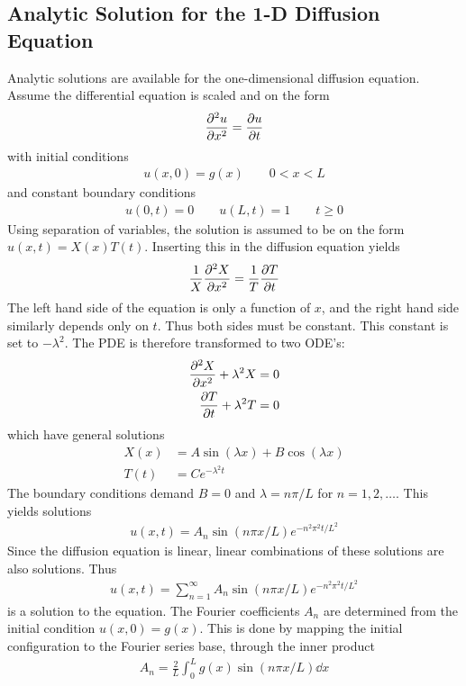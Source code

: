 \documentclass[aps,reprint]{revtex4-1}
\begin{document}
\subsection{Analytic Solution for the 1-D Diffusion Equation} \label{sec:analytic1d}
Analytic solutions are available for the one-dimensional diffusion equation. Assume
the differential equation is scaled and on the form
\begin{align*}
  \pdv[2]{u}{x} = \pdv{u}{t}
\end{align*}
with initial conditions
\begin{align*}
  u(x,0) = g(x) \qquad 0 < x < L
\end{align*}
and constant boundary conditions
\begin{align*}
  u(0,t) = 0 \qquad u(L,t) = 1 \qquad t \geq 0
\end{align*}
Using separation of variables, the solution is assumed to be on the form
$u(x,t) = X(x)T(t)$. Inserting this in the diffusion equation yields
\begin{align*}
  \frac{1}{X} \pdv[2]{X}{x} = \frac{1}{T} \pdv{T}{t}
\end{align*}
The left hand side of the equation is only a function of $x$, and the right hand
side similarly depends only on $t$. Thus both sides must be constant. This
constant is set to $-\lambda^2$.
The PDE is therefore transformed to two ODE's:
\begin{align*}
  \pdv[2]{X}{x} + \lambda^2 X &= 0 \\
  \pdv{T}{t}    + \lambda^2 T &= 0
\end{align*}
which have general solutions
\begin{align*}
  X(x) &= A\sin{(\lambda x)} + B\cos{(\lambda x)} \\
  T(t) &= Ce^{-\lambda^2 t}
\end{align*}
The boundary conditions demand $B = 0$ and $\lambda = n \pi /L$ for $n = 1,2,\hdots$.
This yields solutions
\begin{align*}
  u(x,t) = A_n \sin{(n\pi x/L)}e^{-n^2 \pi^2 t/ L^2}
\end{align*}
Since the diffusion equation is linear, linear combinations of these solutions
are also solutions.
Thus
\begin{align}
  u(x,t) = \sum_{n = 1}^{\infty} A_n \sin{(n\pi x/L)}e^{-n^2 \pi^2 t/ L^2}
\end{align}
is a solution to the equation. The Fourier coefficients $A_n$ are determined
from the initial condition $u(x,0) = g(x)$. This is done by mapping the initial
configuration to the Fourier series base, through the inner product
\begin{align*}
  A_n = \frac{2}{L}\int_0^L g(x) \sin{(n \pi x / L)} \dd{x}
\end{align*}
\end{document}
